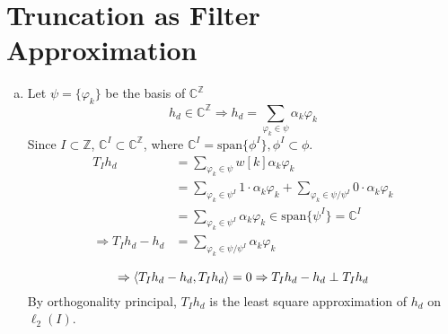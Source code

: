 \section{Truncation as Filter Approximation}\label{sec:p1}

\begin{enumerate}[(a)]
\item Let $\psi = \{\varphi_k\}$ be the basis of $\mathbb{C}^\mathbb{Z}$
\[h_d \in \mathbb{C}^\mathbb{Z} \Rightarrow h_d = \sum_{\varphi_k \in \psi} \alpha_k \varphi_k\]
Since $I \subset \mathbb{Z}$, $\mathbb{C}^I \subset \mathbb{C}^\mathbb{Z}$, where $\mathbb{C}^I = \mathrm{span}\{\phi^I\}, \phi^I \subset \phi$.
\begin{align*}
	T_I h_d
	&= \sum_{\varphi_k \in \psi}w[k]\alpha_k\varphi_k \\
	&= \sum_{\varphi_k \in \psi^I}1\cdot\alpha_k\varphi_k + \sum_{\varphi_k \in \psi/\psi^I}0\cdot\alpha_k\varphi_k\\
	&= \sum_{\varphi_k \in \psi^I}\alpha_k\varphi_k \in \mathrm{span}\{\psi^I\} = \mathbb{C}^I \\
	\Rightarrow T_I h_d - h_d
	&= \sum_{\varphi_k \in \psi/\psi^I} \alpha_k\varphi_k \\
\end{align*}
\[\Rightarrow \left\langle T_I h_d - h_d, T_Ih_d \right\rangle = 0 \Rightarrow T_I h_d - h_d \perp T_Ih_d\]
By orthogonality principal, $T_I h_d$ is the least square approximation of $h_d$ on $\ell_2(I)$.


\end{enumerate}
